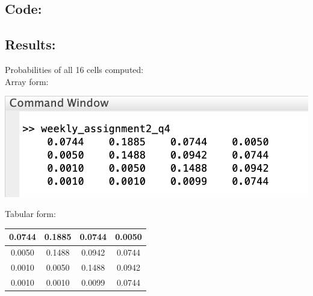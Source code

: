 \documentclass[12pt]{article}%
\begin{document}
\subsection*{Code:}

\newpage
\subsection*{Results:}
Probabilities of all 16 cells computed: \\
Array form: \\
\begin{center}
\includegraphics[scale=0.8]{q4_result} \\
\end{center}
Tabular form: \\
\begin{center}
\begin{tabular}{| c | c | c | c |}
\hline
0.0744 & 0.1885 & 0.0744 & 0.0050 \\
\hline
0.0050 & 0.1488 & 0.0942 & 0.0744 \\
\hline 
0.0010 & 0.0050 & 0.1488 & 0.0942 \\
\hline
0.0010 & 0.0010 & 0.0099 & 0.0744 \\
\hline
\end{tabular}
\end{center}
\end{document}
